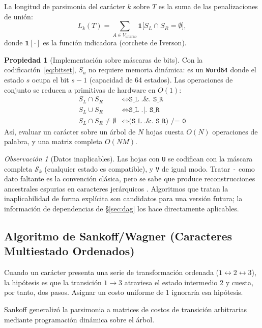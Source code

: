 \documentclass[11pt,a4paper]{article}
\theoremstyle{definition}
\newtheorem{propiedad}{Propiedad}[section]
\theoremstyle{remark}
\newtheorem*{observacion}{Observación}
\newcommand{\ind}{\mathbf{1}}
\begin{document}
La longitud de parsimonia del carácter $k$ sobre $T$ es la suma de las penalizaciones de unión:
\begin{equation}
L_k(T) = \sum_{A \in V_{\text{interno}}} \ind\big[S_L \cap S_R = \emptyset\big],
\end{equation}
donde $\ind[\cdot]$ es la función indicadora (corchete de Iverson).

\begin{propiedad}[Implementación sobre máscaras de bits]
Con la codificación~\eqref{eq:bitset}, $S_u$ no requiere memoria dinámica: es un \texttt{Word64} donde el estado $s$ ocupa el bit $s-1$ (capacidad de 64 estados). Las operaciones de conjunto se reducen a primitivas de hardware en $O(1)$:
\begin{align*}
S_L \cap S_R &\iff \texttt{S\_L .\&. S\_R} \\
S_L \cup S_R &\iff \texttt{S\_L .|. S\_R} \\
S_L \cap S_R \neq \emptyset &\iff \texttt{(S\_L .\&. S\_R) /= 0}
\end{align*}
Así, evaluar un carácter sobre un árbol de $N$ hojas cuesta $O(N)$ operaciones de palabra, y una matriz completa $O(NM)$.
\end{propiedad}

\begin{observacion}[Datos inaplicables]
Las hojas con \texttt{U} se codifican con la máscara completa $\mathcal{S}_k$ (cualquier estado es compatible), y \texttt{V} de igual modo. Tratar \texttt{-} como dato faltante es la convención clásica, pero se sabe que produce reconstrucciones ancestrales espurias en caracteres jerárquicos \cite{maddison1993,strong1999}. Algoritmos que tratan la inaplicabilidad de forma explícita \cite{brazeau2019} son candidatos para una versión futura; la información de dependencias de \S\ref{sec:dag} los hace directamente aplicables.
\end{observacion}

\subsection{Algoritmo de Sankoff/Wagner (Caracteres Multiestado Ordenados)}
\label{sec:sankoff}
Cuando un carácter presenta una serie de transformación ordenada ($1 \leftrightarrow 2 \leftrightarrow 3$), la hipótesis es que la transición $1 \to 3$ atraviesa el estado intermedio 2 y cuesta, por tanto, dos pasos. Asignar un costo uniforme de 1 ignoraría esa hipótesis.

Sankoff \cite{sankoff1975} generalizó la parsimonia a matrices de costos de transición arbitrarias mediante programación dinámica sobre el árbol.
\end{document}
